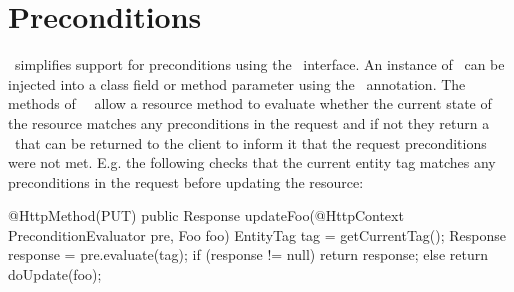 \section{Preconditions}

\jaxrs\ simplifies support for preconditions using the \PreconditionEvaluator\ interface. An instance of \PreconditionEvaluator\ can be injected into a class field or method parameter using the \HttpContext\ annotation. The methods of \ \PreconditionEvaluator\ allow a resource method to evaluate whether the current state of the resource matches any preconditions in the request and if not they return a \Response\ that can be returned to the client to inform it that the request preconditions were not met. E.g. the following checks that the current entity tag matches any preconditions in the request before updating the resource:

\begin{listing}{1}
@HttpMethod(PUT)
public Response updateFoo(@HttpContext PreconditionEvaluator pre, Foo foo) {
	EntityTag tag = getCurrentTag();
	Response response = pre.evaluate(tag);
	if (response != null)
	  return response;
	else
	  return doUpdate(foo);
}
\end{listing}
